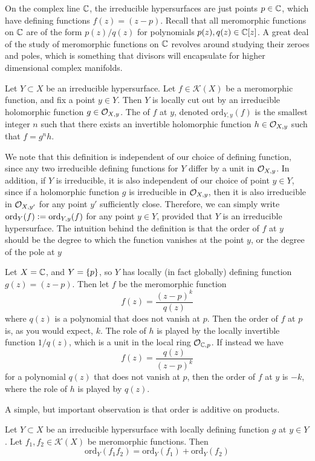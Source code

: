 On the complex line $\mathbb{C}$, the irreducible hypersurfaces are just points $p \in \mathbb{C}$,
which have defining functions $f(z) = (z-p)$. Recall that all meromorphic functions
on $\mathbb{C}$ are of the form $p(z)/q(z)$ for polynomials $p(z),q(z) \in \mathbb{C}[z]$. A great
deal of the study of meromorphic functions on $\mathbb{C}$ revolves around studying their zeroes
and poles, which is something that divisors will encapsulate for higher dimensional
complex manifolds.
%
\begin{defn}
Let $Y \subset X$ be an irreducible hypersurface. Let $f \in \mathcal{K}(X)$ be a
meromorphic function, and fix a point $y \in Y$. Then $Y$ is locally cut out by an
irreducible holomorphic function $g \in \mathcal{O}_{X,y}$. The  of $f$ at
$y$, denoted $\mathrm{ord}_{Y,y}(f)$ is the smallest integer $n$ such that there exists
an invertible holomorphic function $h \in \mathcal{O}_{X,y}$ such that $f= g^nh$.
\end{defn}
%
We note that this definition is independent of our choice of defining function, since
any two irreducible defining functions for $Y$ differ by a unit in $\mathcal{O}_{X,y}$. In
addition, if $Y$ is irreducible, it is also independent of our choice of point $y \in Y$,
since if a holomorphic function $g$ is irreducible in $\mathcal{O}_{X,y}$, then it is also
irreducible in $\mathcal{O}_{X,y'}$ for any point $y'$ sufficiently close. Therefore, we can
simply write $\mathrm{ord}_Y(f) \vcentcolon= \mathrm{ord}_{Y,y}(f)$ for any point $y \in Y$,
provided that $Y$ is an irreducible hypersurface. The intuition behind the definition
is that the order of $f$ at $y$ should be the degree to which the function vanishes
at the point $y$, or the degree of the pole at $y$
%
\begin{exmp}
Let $X = \mathbb{C}$, and $Y = \left\lbrace p \right\rbrace$, so $Y$ has locally (in fact globally) defining
function $g(z) = (z-p)$. Then let $f$ be the meromorphic function
\[
f(z) = \frac{(z-p)^k}{q(z)}
\]
where $q(z)$ is a polynomial that does not vanish at $p$.
Then the order of $f$ at $p$ is, as you would expect, $k$. The role of $h$
is played by the locally invertible function $1/q(z)$, which is a unit in the local
ring $\mathcal{O}_{\mathbb{C},p}$. If instead we have
\[
f(z) = \frac{q(z)}{(z-p)^k}
\]
for a polynomial $q(z)$ that does not vanish at $p$, then the order of $f$
at $y$ is $-k$, where the role of $h$ is played by $q(z)$.
\end{exmp}
%
A simple, but important observation is that order is additive on products.
%
\begin{prop}
Let $Y \subset X$ be an irreducible hypersurface with locally defining function
$g$ at $y \in Y$. Let $f_1,f_2 \in \mathcal{K}(X)$ be meromorphic functions. Then
\[
\mathrm{ord}_Y(f_1f_2) = \mathrm{ord}_Y(f_1) + \mathrm{ord}_Y(f_2)
\]
\end{prop}

